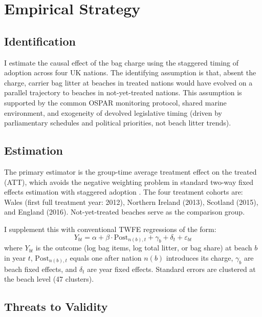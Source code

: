\documentclass[12pt]{article}
\begin{document}


\section{Empirical Strategy}

\subsection{Identification}

I estimate the causal effect of the bag charge using the staggered timing of adoption across four UK nations. The identifying assumption is that, absent the charge, carrier bag litter at beaches in treated nations would have evolved on a parallel trajectory to beaches in not-yet-treated nations. This assumption is supported by the common OSPAR monitoring protocol, shared marine environment, and exogeneity of devolved legislative timing (driven by parliamentary schedules and political priorities, not beach litter trends).

\subsection{Estimation}

The primary estimator is the \citet{callaway_difference--differences_2021} group-time average treatment effect on the treated (ATT), which avoids the negative weighting problem in standard two-way fixed effects estimation with staggered adoption \citep{goodman-bacon_difference--differences_2021}. The four treatment cohorts are: Wales (first full treatment year: 2012), Northern Ireland (2013), Scotland (2015), and England (2016). Not-yet-treated beaches serve as the comparison group.

I supplement this with conventional TWFE regressions of the form:
\begin{equation}
Y_{bt} = \alpha + \beta \cdot \text{Post}_{n(b),t} + \gamma_b + \delta_t + \varepsilon_{bt}
\end{equation}
where $Y_{bt}$ is the outcome (log bag items, log total litter, or bag share) at beach $b$ in year $t$, $\text{Post}_{n(b),t}$ equals one after nation $n(b)$ introduces its charge, $\gamma_b$ are beach fixed effects, and $\delta_t$ are year fixed effects. Standard errors are clustered at the beach level (47 clusters).

\subsection{Threats to Validity}
\end{document}
